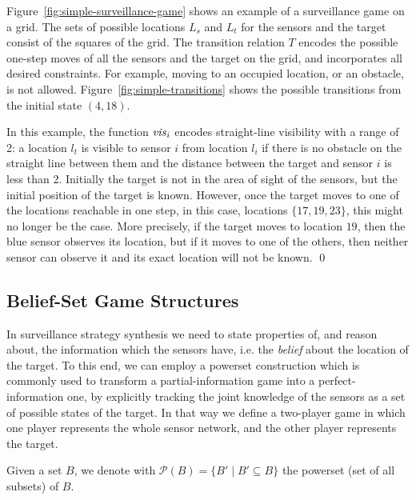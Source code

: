 \begin{example}\label{ex:simple-surveillance-game}
Figure~\ref{fig:simple-surveillance-game} shows an example of a surveillance game on a grid.  The sets of possible locations $L_s$ and $L_t$ for the sensors and the target consist of the squares of the  grid. The transition relation $T$ encodes the possible one-step moves of all the sensors and the target on the grid, and incorporates all desired constraints. For example, moving to an occupied location, or an obstacle, is not allowed. Figure~\ref{fig:simple-transitions} shows the possible transitions from the initial state $(4,18)$.

In this example, the function $\mathit{vis}_i$ encodes straight-line visibility with a range of 2: a location $l_t$ is visible to sensor $i$ from location $l_i$ if there is no obstacle on the straight line between them and the distance between the target and sensor $i$ is less than 2. Initially the target is not in the area of sight of the sensors, but the initial position of the target is known. However, once the target moves to one of the locations reachable in one step, in this case, locations $\{17,19,23\}$, this might no longer be the case. More precisely, if the target moves to location $19$, then the blue sensor observes its location, but if it moves to one of the others, then neither sensor can observe it and its exact location will not be known. \qed
\end{example}




\subsection{Belief-Set Game Structures}\label{sec:belief-gs}

In surveillance strategy synthesis we need to state properties of, and reason about, the information which the sensors have, i.e. the \emph{belief} about the location of the target. To this end, we can employ a powerset construction which is commonly used to transform a partial-information game into a perfect-information one, by explicitly tracking the joint knowledge of the sensors as a set of possible states of the target. In that way we define a two-player game in which one player represents the whole sensor network, and the other player represents the target.

Given a set $B$, we denote with $\mathcal{P}(B) = \{B' \mid B'\subseteq B\}$ the powerset (set of all subsets) of $B$.

